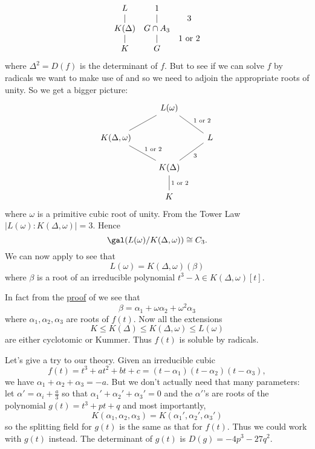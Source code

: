 \documentclass[a4paper]{article}
\begin{document}
\[
  \begin{array}[h]{ccc}
    L & 1 & \\
    | & | & 3 \\
    K(\Delta) & G \cap A_3 \\
    | & | & 1 \text{ or } 2 \\
    K & G &
  \end{array}
\]
where \(\Delta^2 = D(f)\) is the determinant of \(f\). But to see if we can solve \(f\) by radicals we want to make use of  and so we need to adjoin the appropriate roots of unity. So we get a bigger picture:
\[
  \begin{tikzcd}
    & L(\omega) \ar[dl, dash] \ar[dr, dash, "1 \text{ or } 2"] & \\
    K(\Delta, \omega) \ar[dr, dash, "1 \text{ or } 2"] & & L \ar[dl, dash, "3"] \\
    & K(\Delta) \ar[d, dash, "1 \text{ or } 2"] & \\
    & K &
  \end{tikzcd}
\]
where \(\omega\) is a primitive cubic root of unity. From the Tower Law \(|L(\omega):K(\Delta, \omega)| = 3\). Hence
\[
  \gal(L(\omega)/K(\Delta, \omega)) \cong C_3.
\]
We can now apply  to see that
\[
  L(\omega) = K(\Delta, \omega)(\beta)
\]
where \(\beta\) is a root of an irreducible polynomial \(t^3 - \lambda \in K(\Delta, \omega)[t]\).

In fact from the \hyperref[proof:kummer theory]{proof} of  we see that
\[
  \beta = \alpha_1 + \omega \alpha_2 + \omega^2 \alpha_3
\]
where \(\alpha_1, \alpha_2, \alpha_3\) are roots of \(f(t)\). Now all the extensions
\[
  K \leq K(\Delta) \leq K(\Delta, \omega) \leq L(\omega)
\]
are either cyclotomic or Kummer. Thus \(f(t)\) is soluble by radicals.

Let's give a try to our theory. Given an irreducible cubic
\[
  f(t) = t^3 + at^2 + bt + c = (t - \alpha_1)(t - \alpha_2)(t - \alpha_3),
\]
we have \(\alpha_1 + \alpha_2 + \alpha_3 = -a\). But we don't actually need that many parameters: let \(\alpha' = \alpha_i + \frac{a}{3}\) so that \(\alpha_1' + \alpha_2' + \alpha_3' = 0\) and the \(\alpha'\)'s are roots of the polynomial \(g(t) = t^3 + pt + q\) and most importantly,
\[
  K(\alpha_1, \alpha_2, \alpha_3) = K(\alpha_1', \alpha_2', \alpha_3')
\]
so the splitting field for \(g(t)\) is the same as that for \(f(t)\). Thus we could work with \(g(t)\) instead. The determinant of \(g(t)\) is \(D(g) = -4p^3 - 27q^2\).
\end{document}
